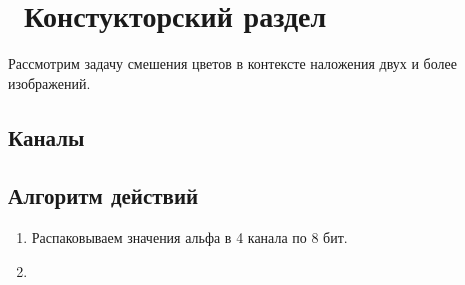 \chapter{ Констукторский раздел}
\label{cha:design}
 Рассмотрим задачу смешения цветов в контексте наложения двух и более изображений.
 
 \section{Каналы}
 
 \section{Алгоритм действий}
 \begin{enumerate}
 	\item Распаковываем значения альфа в 4 канала по 8 бит.
 	\item   
 \end{enumerate}